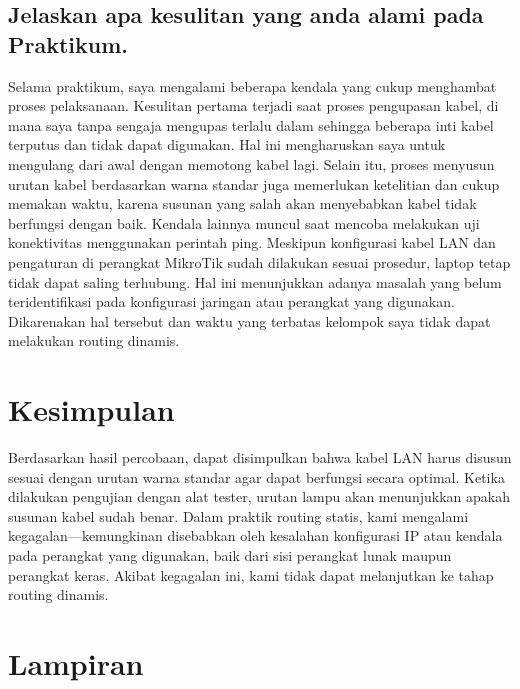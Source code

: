 \subsection{Jelaskan apa kesulitan yang anda alami pada Praktikum.}
Selama praktikum, saya mengalami beberapa kendala yang cukup menghambat proses pelaksanaan. Kesulitan pertama terjadi saat proses pengupasan kabel, di mana saya tanpa sengaja mengupas terlalu dalam sehingga beberapa inti kabel terputus dan tidak dapat digunakan. Hal ini mengharuskan saya untuk mengulang dari awal dengan memotong kabel lagi. Selain itu, proses menyusun urutan kabel berdasarkan warna standar juga memerlukan ketelitian dan cukup memakan waktu, karena susunan yang salah akan menyebabkan kabel tidak berfungsi dengan baik. Kendala lainnya muncul saat mencoba melakukan uji konektivitas menggunakan perintah ping. Meskipun konfigurasi kabel LAN dan pengaturan di perangkat MikroTik sudah dilakukan sesuai prosedur, laptop tetap tidak dapat saling terhubung. Hal ini menunjukkan adanya masalah yang belum teridentifikasi pada konfigurasi jaringan atau perangkat yang digunakan. Dikarenakan hal tersebut dan waktu yang terbatas kelompok saya tidak dapat melakukan routing dinamis.

\section{Kesimpulan}
Berdasarkan hasil percobaan, dapat disimpulkan bahwa kabel LAN harus disusun sesuai dengan urutan warna standar agar dapat berfungsi secara optimal. Ketika dilakukan pengujian dengan alat tester, urutan lampu akan menunjukkan apakah susunan kabel sudah benar. Dalam praktik routing statis, kami mengalami kegagalan—kemungkinan disebabkan oleh kesalahan konfigurasi IP atau kendala pada perangkat yang digunakan, baik dari sisi perangkat lunak maupun perangkat keras. Akibat kegagalan ini, kami tidak dapat melanjutkan ke tahap routing dinamis.

\section{Lampiran}

